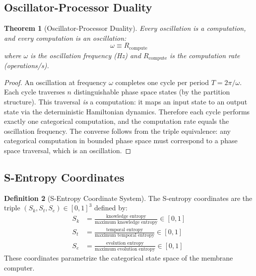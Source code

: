 \documentclass[twocolumn,10pt,a4paper]{article}
\newtheorem{theorem}{Theorem}[section]
\theoremstyle{definition}
\newtheorem{definition}[theorem]{Definition}
\theoremstyle{remark}
\newcommand{\Sk}{S_k}
\newcommand{\St}{S_t}
\newcommand{\Se}{S_e}
\newcommand{\Rcompute}{R_{\mathrm{compute}}}
\begin{document}
\subsection{Oscillator-Processor Duality}

\begin{theorem}[Oscillator-Processor Duality]
\label{thm:duality}
Every oscillation is a computation, and every computation is an oscillation:
\begin{equation}
\label{eq:duality}
\omega \equiv \Rcompute
\end{equation}
where $\omega$ is the oscillation frequency (Hz) and $\Rcompute$ is the computation rate (operations/s).
\end{theorem}

\begin{proof}
An oscillation at frequency $\omega$ completes one cycle per period $T = 2\pi/\omega$. Each cycle traverses $n$ distinguishable phase space states (by the partition structure). This traversal \emph{is} a computation: it maps an input state to an output state via the deterministic Hamiltonian dynamics. Therefore each cycle performs exactly one categorical computation, and the computation rate equals the oscillation frequency. The converse follows from the triple equivalence: any categorical computation in bounded phase space must correspond to a phase space traversal, which is an oscillation. \qedhere
\end{proof}

\subsection{S-Entropy Coordinates}

\begin{definition}[S-Entropy Coordinate System]
\label{def:sentropy}
The S-entropy coordinates are the triple $(\Sk, \St, \Se) \in [0,1]^3$ defined by:
\begin{align}
\Sk &= \frac{\text{knowledge entropy}}{\text{maximum knowledge entropy}} \in [0,1] \label{eq:sk} \\
\St &= \frac{\text{temporal entropy}}{\text{maximum temporal entropy}} \in [0,1] \label{eq:st} \\
\Se &= \frac{\text{evolution entropy}}{\text{maximum evolution entropy}} \in [0,1] \label{eq:se}
\end{align}
These coordinates parametrize the categorical state space of the membrane computer.
\end{definition}
\end{document}
